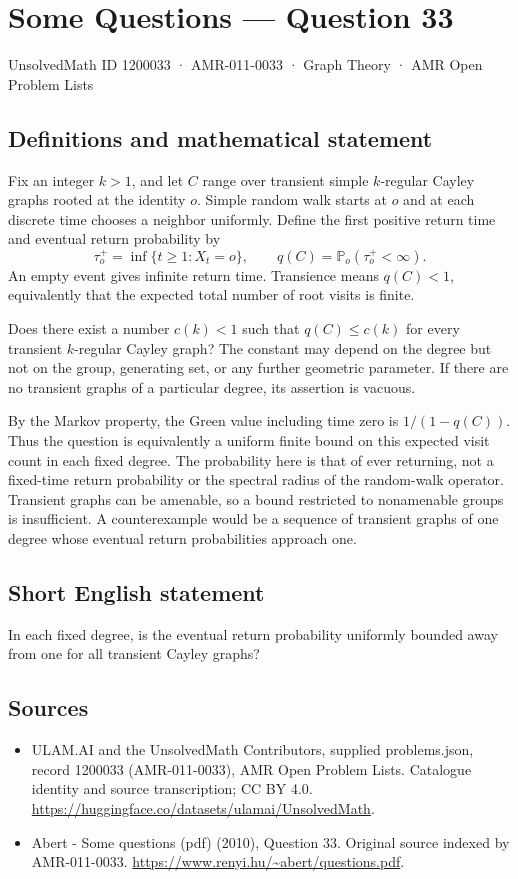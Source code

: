 \documentclass[11pt,a4paper]{article}
\begin{document}
\section*{Some Questions — Question 33}\label{1200033}
{\small UnsolvedMath ID 1200033 · AMR-011-0033 · Graph Theory · AMR Open Problem Lists}
\subsection{Definitions and mathematical statement}
Fix an integer $k>1$, and let $C$ range over transient simple $k$-regular Cayley graphs rooted at the identity $o$. Simple random walk starts at $o$ and at each discrete time chooses a neighbor uniformly. Define the first positive return time and eventual return probability by
\[
 \tau_o^+=\inf\{t\geq1:X_t=o\},\qquad
 q(C)=\mathbb P_o(\tau_o^+<\infty).
\]
An empty event gives infinite return time. Transience means $q(C)<1$, equivalently that the expected total number of root visits is finite.

Does there exist a number $c(k)<1$ such that $q(C)\leq c(k)$ for every transient $k$-regular Cayley graph? The constant may depend on the degree but not on the group, generating set, or any further geometric parameter. If there are no transient graphs of a particular degree, its assertion is vacuous.

By the Markov property, the Green value including time zero is $1/(1-q(C))$. Thus the question is equivalently a uniform finite bound on this expected visit count in each fixed degree. The probability here is that of ever returning, not a fixed-time return probability or the spectral radius of the random-walk operator. Transient graphs can be amenable, so a bound restricted to nonamenable groups is insufficient. A counterexample would be a sequence of transient graphs of one degree whose eventual return probabilities approach one.
\subsection{Short English statement}
In each fixed degree, is the eventual return probability uniformly bounded away from one for all transient Cayley graphs?
\subsection{Sources}
\begin{itemize}
\item[S1] ULAM.AI and the UnsolvedMath Contributors, supplied problems.json, record 1200033 (AMR-011-0033), AMR Open Problem Lists. Catalogue identity and source transcription; CC BY 4.0.
\url{https://huggingface.co/datasets/ulamai/UnsolvedMath}.
\item[S2] Abert - Some questions (pdf) (2010), Question 33. Original source indexed by AMR-011-0033.
\url{https://www.renyi.hu/~abert/questions.pdf}.
\end{itemize}
\end{document}
